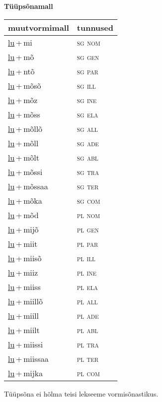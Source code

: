 
\vspace{1.8em}
\begin{minipage}{\textwidth}
\textbf{Tüüpsõnamall \,}\\

\begin{sideways}
\begin{tabular}{l l}
muutvormimall & tunnused \\
\hline
\underline{lu}\,+\,mi & \textsc{ sg nom } \\
\underline{lu}\,+\,mõ & \textsc{ sg gen } \\
\underline{lu}\,+\,ntõ & \textsc{ sg par } \\
\underline{lu}\,+\,mõsõ & \textsc{ sg ill } \\
\underline{lu}\,+\,mõz & \textsc{ sg ine } \\
\underline{lu}\,+\,mõss & \textsc{ sg ela } \\
\underline{lu}\,+\,mõllõ & \textsc{ sg all } \\
\underline{lu}\,+\,mõll & \textsc{ sg ade } \\
\underline{lu}\,+\,mõlt & \textsc{ sg abl } \\
\underline{lu}\,+\,mõssi & \textsc{ sg tra } \\
\underline{lu}\,+\,mõssaa & \textsc{ sg ter } \\
\underline{lu}\,+\,mõka & \textsc{ sg com } \\
\underline{lu}\,+\,mõd & \textsc{ pl nom } \\
\underline{lu}\,+\,mijõ & \textsc{ pl gen } \\
\underline{lu}\,+\,miit & \textsc{ pl par } \\
\underline{lu}\,+\,miisõ & \textsc{ pl ill } \\
\underline{lu}\,+\,miiz & \textsc{ pl ine } \\
\underline{lu}\,+\,miiss & \textsc{ pl ela } \\
\underline{lu}\,+\,miillõ & \textsc{ pl all } \\
\underline{lu}\,+\,miill & \textsc{ pl ade } \\
\underline{lu}\,+\,miilt & \textsc{ pl abl } \\
\underline{lu}\,+\,miissi & \textsc{ pl tra } \\
\underline{lu}\,+\,miissaa & \textsc{ pl ter } \\
\underline{lu}\,+\,mijka & \textsc{ pl com } \\
\end{tabular}
\end{sideways}
\label{tab:tüüpsõnamall-lumi}

\end{minipage}

 
\vspace{1em}
\noindent Tüüpsõna ei hõlma teisi lekseeme vormi\-sõnastikus.
